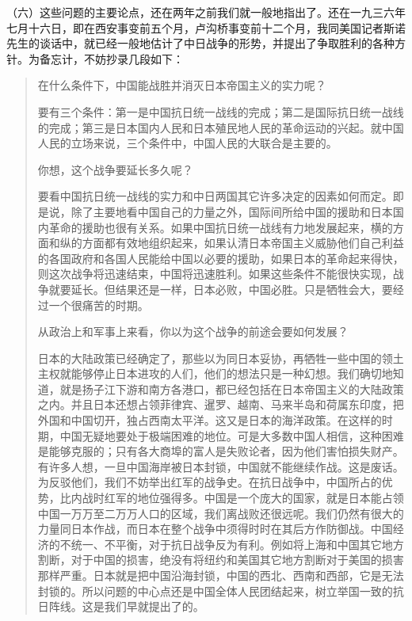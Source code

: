 （六）这些问题的主要论点，还在两年之前我们就一般地指出了。还在一九三六年七月十六日，即在西安事变前五个月，卢沟桥事变前十二个月，我同美国记者斯诺先生的谈话中，就已经一般地估计了中日战争的形势，并提出了争取胜利的各种方针。为备忘计，不妨抄录几段如下：

\begin{quote}
\begin{description}[qa]
\item[问：]在什么条件下，中国能战胜并消灭日本帝国主义的实力呢？
\item[答：]要有三个条件：第一是中国抗日统一战线的完成；第二是国际抗日统一战线的完成；第三是日本国内人民和日本殖民地人民的革命运动的兴起。就中国人民的立场来说，三个条件中，中国人民的大联合是主要的。
\item[问：]你想，这个战争要延长多久呢？
\item[答：]要看中国抗日统一战线的实力和中日两国其它许多决定的因素如何而定。即是说，除了主要地看中国自己的力量之外，国际间所给中国的援助和日本国内革命的援助也很有关系。如果中国抗日统一战线有力地发展起来，横的方面和纵的方面都有效地组织起来，如果认清日本帝国主义威胁他们自己利益的各国政府和各国人民能给中国以必要的援助，如果日本的革命起来得快，则这次战争将迅速结束，中国将迅速胜利。如果这些条件不能很快实现，战争就要延长。但结果还是一样，日本必败，中国必胜。只是牺牲会大，要经过一个很痛苦的时期。
\item[问：]从政治上和军事上来看，你以为这个战争的前途会要如何发展？
\item[答：]日本的大陆政策已经确定了，那些以为同日本妥协，再牺牲一些中国的领土主权就能够停止日本进攻的人们，他们的想法只是一种幻想。我们确切地知道，就是扬子江下游和南方各港口，都已经包括在日本帝国主义的大陆政策之内。并且日本还想占领菲律宾、暹罗、越南、马来半岛和荷属东印度，把外国和中国切开，独占西南太平洋。这又是日本的海洋政策。在这样的时期，中国无疑地要处于极端困难的地位。可是大多数中国人相信，这种困难是能够克服的；只有各大商埠的富人是失败论者，因为他们害怕损失财产。有许多人想，一旦中国海岸被日本封锁，中国就不能继续作战。这是废话。为反驳他们，我们不妨举出红军的战争史。在抗日战争中，中国所占的优势，比内战时红军的地位强得多。中国是一个庞大的国家，就是日本能占领中国一万万至二万万人口的区域，我们离战败还很远呢。我们仍然有很大的力量同日本作战，而日本在整个战争中须得时时在其后方作防御战。中国经济的不统一、不平衡，对于抗日战争反为有利。例如将上海和中国其它地方割断，对于中国的损害，绝没有将纽约和美国其它地方割断对于美国的损害那样严重。日本就是把中国沿海封锁，中国的西北、西南和西部，它是无法封锁的。所以问题的中心点还是中国全体人民团结起来，树立举国一致的抗日阵线。这是我们早就提出了的。

\end{description}
\end{quote}
